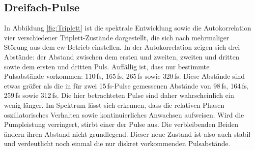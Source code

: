 \documentclass[bachelor,       %
               twoside,        %
               BCOR10mm,       %
               liststotoc,nomtotoc,bibtotoc, %
               english,ngerman, %
               final,          %
               ]{GAUBM}
\begin{document}
\clearpage

\subsection{Dreifach-Pulse}
In Abbildung \ref{fig:Triplett} ist die spektrale Entwicklung sowie die Autokorrelation vier verschiedener Triplett-Zustände dargestellt, die sich nach mehrmaliger Störung aus dem cw-Betrieb einstellen.
In der Autokorrelation zeigen sich drei Abstände: der Abstand zwischen dem ersten und zweiten, zweiten und dritten sowie dem ersten und dritten Puls.
Auffällig ist, dass nur bestimmte Pulsabstände vorkommen: 110\,fs, 165\,fs, 265\,fs sowie 320\,fs.
Diese Abstände sind etwas größer als die in \cite{kitano_stable_1998} für zwei 15\,fs-Pulse gemessenen Abstände von 98\,fs, 164\,fs, 259\,fs sowie 312\,fs.
Die hier betrachteten Pulse sind daher wahrscheinlich ein wenig länger.
Im Spektrum lässt sich erkennen, dass die relativen Phasen oszillatorisches Verhalten sowie kontinuierliches Anwachsen aufweisen.
Wird die Pumpleistung verringert, stirbt einer der Pulse aus.
Die verbleibenden Beiden ändern ihren Abstand nicht grundlegend.
Dieser neue Zustand ist also auch stabil und verdeutlicht noch einmal die nur diskret vorkommenden Pulsabstände.
\end{document}
